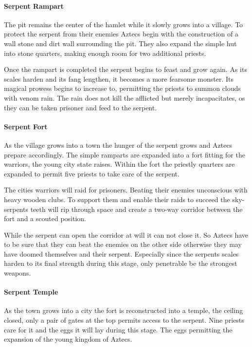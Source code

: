 \documentclass[a4paper]{article}
\begin{document}
			\paragraph{Serpent Rampart}
				The pit remains the center of the hamlet while it slowly grows into a village.
				To protect the serpent from their enemies \gls{Aztecs}
				begin with the construction of a wall stone and dirt wall surrounding the pit.
				They also expand the simple hut into stone quarters, making enough room
				for two additional priests.

				Once the rampart is completed the serpent begins to feast and grow again.
				As its scales harden and its fang lengthen, it becomes a more fearsome monster.
				Its magical prowess begins to increase to,
				permitting the priests to summon clouds with venom rain.
				The rain does not kill the afflicted but merely incapacitates,
				os they can be taken prisoner and feed to the serpent.

			\paragraph{Serpent Fort}
				As the village grows into a town the hunger of the serpent grows and \gls{Aztecs} 
				prepare accordingly.
				The simple ramparts are expanded into a fort fitting for the warriors,
				the young city state raises.
				Within the fort the priestly quarters are expanded to permit five priests
				to take care of the serpent.

				The cities warriors will raid for prisoners.
				Beating their enemies unconscious with heavy wooden clubs.
				To support them and enable their raids to succeed the sky-serpents
				teeth will rip through space and create a two-way corridor
				between the fort and a scouted position.

				While the serpent can open the corridor at will it can not close it.
				So \gls{Aztecs} have to be sure that they can beat the enemies on
				the other side otherwise they may have doomed themselves and their serpent.
				Especially since the serpents scales harden to its final strength during this stage,
				only penetrable be the strongest weapons.

			\paragraph{Serpent Temple}
				As the town grows into a city the fort is reconstructed into a temple, the ceiling closed,
				only a pair of gates at the top permits access to the serpent.
				Nine priests care for it and the eggs it will lay during this stage.
				The eggs permitting the expansion of the young kingdom of \gls{Aztecs}.
\end{document}
